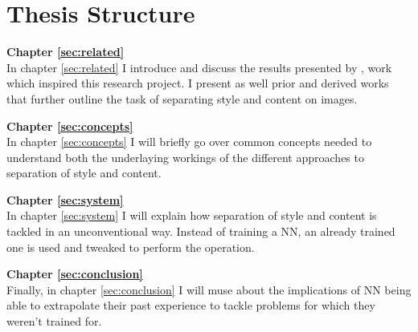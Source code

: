
%
%



\section{Thesis Structure}
\label{sec:intro:structure}

\textbf{Chapter \ref{sec:related}} \\[0.2em]
In chapter \ref{sec:related} I introduce and discuss the results presented by \cite{Gatys2015}, work which inspired this research project. I present as well prior and derived works that further outline the task of separating style and content on images.

\textbf{Chapter \ref{sec:concepts}} \\[0.2em]
In chapter \ref{sec:concepts} I will briefly go over common concepts needed to understand both the underlaying workings of the different approaches to separation of style and content.

\textbf{Chapter \ref{sec:system}} \\[0.2em]
In chapter \ref{sec:system} I will explain how separation of style and content is tackled in an unconventional way. Instead of training a NN, an already trained one is used and tweaked to perform the operation.

\textbf{Chapter \ref{sec:conclusion}} \\[0.2em]
Finally, in chapter \ref{sec:conclusion} I will muse about the implications of NN being able to extrapolate their past experience to tackle problems for which they weren't trained for.
